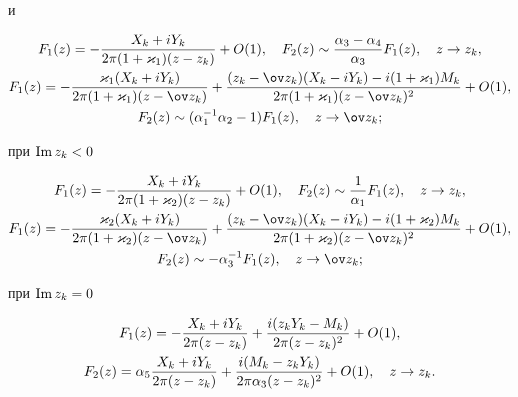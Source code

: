 и 


\begin{gather} 


F_1(z)=-\frac{X_k+iY_k}{2\pi(1+\varkappa_1)(z-z_k)}+O(1),\quad 


F_2(z)\sim\frac{\alpha_3-\alpha_4}{\alpha_3}F_1(z),\quad z\to z_k,\\ 


%


F_1(z)=-\frac{\varkappa_1(X_k+iY_k)} 


{2\pi(1+\varkappa_1)(z-\ov z_k)}+ 


\frac{(z_k-\ov z_k)(X_k-iY_k)-i(1+\varkappa_1)M_k} 


{2\pi(1+\varkappa_1)(z-\ov z_k)^2}+O(1),\notag\\ 


%


F_2(z)\sim(\alpha^{-1}_1\alpha_2-1)F_1(z),\quad z\to\ov z_k;\notag 


\end{gather} 


при $\operatorname{Im} z_k<0$ 


\begin{gather} 


F_1(z)=-\frac{X_k+iY_k}{2\pi(1+\varkappa_2)(z-z_k)}+O(1),\quad 


F_2(z)\sim\frac{1}{\alpha_1}F_1(z),\quad z\to z_k,\\ 


%


F_1(z)=-\frac{\varkappa_2(X_k+iY_k)}{2\pi(1+\varkappa_2)(z-\ov z_k)}+ 


\frac{(z_k-\ov z_k)(X_k-iY_k)-i(1+\varkappa_2)M_k} 


{2\pi(1+\varkappa_2)(z-\ov z_k)^2}+O(1),\notag \\ 


%


F_2(z)\sim-\alpha^{-1}_3F_1(z),\quad z\to \ov z_k;\notag 


\end{gather} 


при $\operatorname{Im} z_k=0$ 


\begin{gather} 


F_1(z)=-\frac{X_k+iY_k}{2\pi(z-z_k)}+ 


\frac{i(z_k Y_k-M_k)}{2\pi(z-z_k)^2}+O(1),\\ 


F_2(z)=\alpha_5\frac{X_k+iY_k}{2\pi(z-z_k)}+ 


\frac{i(M_k-z_k Y_k)}{2\pi\alpha_3(z-z_k)^2}+O(1),\quad 


z\to z_k.\notag 


\end{gather} 


